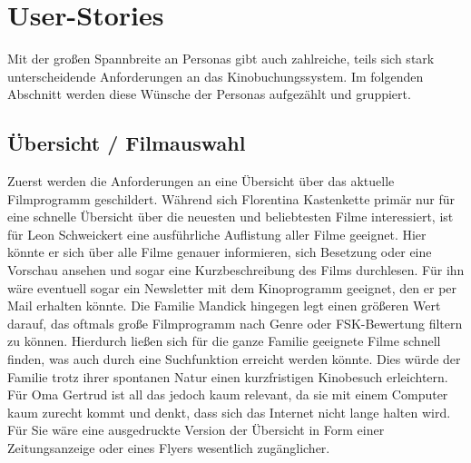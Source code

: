 \section{User-Stories}

Mit der großen Spannbreite an Personas gibt auch zahlreiche, teils sich stark unterscheidende Anforderungen an das Kinobuchungssystem. Im folgenden Abschnitt werden diese Wünsche der Personas aufgezählt und gruppiert.

\subsection{Übersicht / Filmauswahl}
Zuerst werden die Anforderungen an eine Übersicht über das aktuelle Filmprogramm geschildert. Während sich Florentina Kastenkette primär nur für eine schnelle Übersicht über die neuesten und beliebtesten Filme interessiert, ist für Leon Schweickert eine ausführliche Auflistung aller Filme geeignet. Hier könnte er sich über alle Filme genauer informieren, sich Besetzung oder eine Vorschau ansehen und sogar eine Kurzbeschreibung des Films durchlesen. Für ihn wäre eventuell sogar ein Newsletter mit dem Kinoprogramm geeignet, den er per Mail erhalten könnte. Die Familie Mandick hingegen legt einen größeren Wert darauf, das oftmals große Filmprogramm nach Genre oder FSK-Bewertung filtern zu können. Hierdurch ließen sich für die ganze Familie geeignete Filme schnell finden, was auch durch eine Suchfunktion erreicht werden könnte. Dies würde der Familie trotz ihrer spontanen Natur einen kurzfristigen Kinobesuch erleichtern. Für Oma Gertrud ist all das jedoch kaum relevant, da sie mit einem Computer kaum zurecht kommt und denkt, dass sich das Internet nicht lange halten wird. Für Sie wäre eine ausgedruckte Version der Übersicht in Form einer Zeitungsanzeige oder eines Flyers wesentlich zugänglicher.

